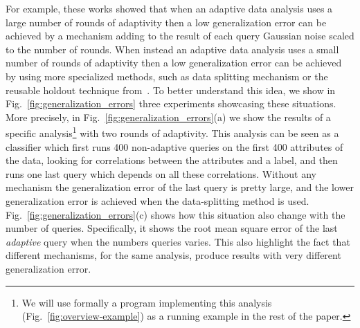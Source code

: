 For example, these works showed that when an adaptive data analysis uses a large number of rounds of adaptivity then a low generalization error can be achieved by a mechanism  
adding to the result of each query Gaussian noise scaled to the number of rounds. When instead  an adaptive data analysis uses a small number of rounds of adaptivity then a low generalization error can be achieved by using more specialized methods, such as data splitting mechanism or the reusable holdout technique from~\citet{DworkFHPRR15}.
To better understand this idea, we show in Fig.~\ref{fig:generalization_errors} three experiments showcasing these situations. More precisely, in Fig.~\ref{fig:generalization_errors}(a) we show the results of a specific analysis\footnote{We will use formally a program implementing this analysis (Fig.~\ref{fig:overview-example}) as a running example in the rest of the paper.} with two rounds of adaptivity. This analysis can be seen as a classifier which first runs 400 non-adaptive queries on the first 400 attributes of the data, looking for correlations between the attributes and a label, and then runs one last query which depends on all these correlations. Without any mechanism the generalization error of the last query is pretty large, and the lower generalization error is achieved when the data-splitting method is used. Fig.~\ref{fig:generalization_errors}(c) shows how this situation also change with the number of queries. Specifically, it shows the root mean square error of the last \emph{adaptive} query when the numbers queries varies. This also highlight the fact that different mechanisms, for the same analysis, produce results with very different generalization error.
